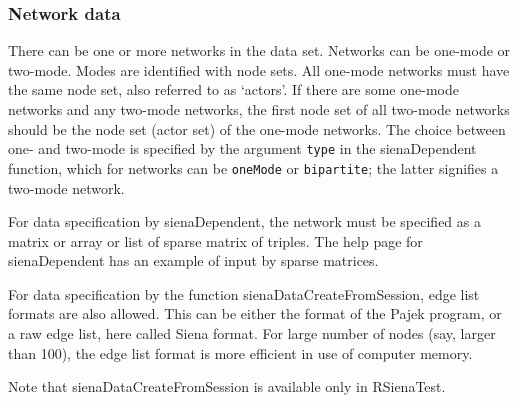 \documentclass[a4paper,fleqn,11pt]{article}
\newcommand{\+}{\, + \,}
\begin{document}
\subsubsection{Network data}

There can be one or more networks in the data set.
Networks can be one-mode or two-mode.
Modes are identified with node sets.
All one-mode networks must have the same node set,
also referred to as `actors'.
If there are some one-mode networks and any two-mode networks,
the first node set of all two-mode networks should be the node set
(actor set) of the one-mode networks.
The choice between one- and two-mode is specified by the argument
\texttt{type} in  the \textsf{sienaDependent} function, which for
networks can be \texttt{oneMode} or \texttt{bipartite};
the latter signifies a two-mode network.

For data specification by  \textsf{sienaDependent}, the network
must be specified as a matrix or array or list of sparse matrix of triples.
The help page for \textsf{sienaDependent} has an example of input
by sparse matrices.

For data specification by
the function \textsf{sienaDataCreateFromSession},
edge list formats are also allowed. This can be either the
format of the Pajek program, or a raw edge list, here called Siena format.
For large number of nodes (say, larger than 100), the edge list
format is more efficient in use of computer memory.

Note that  \textsf{sienaDataCreateFromSession} is available only
in  \textsf{RSienaTest}.
\end{document}
